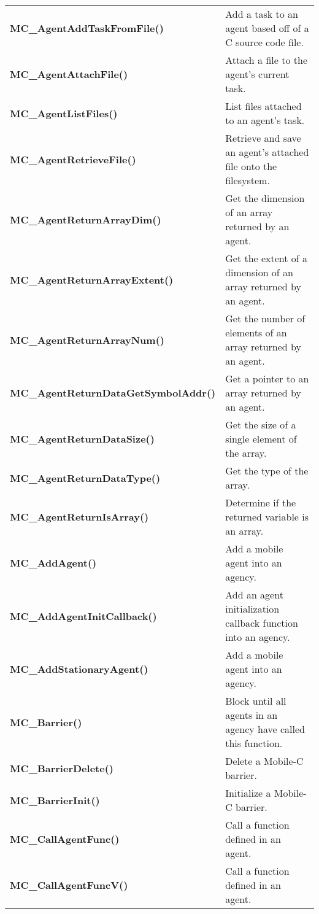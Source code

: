 \begin{table}[!hp]
\begin{center}
\begin{tabular}{p{78 mm}p{77 mm}}
{\bf MC\_AgentAddTaskFromFile()} \dotfill & Add a task to an agent based off of a C source code file. \\
{\bf MC\_AgentAttachFile()} \dotfill & Attach a file to the agent's current task. \\
{\bf MC\_AgentListFiles()} \dotfill & List files attached to an agent's task. \\
{\bf MC\_AgentRetrieveFile()} \dotfill & Retrieve and save an agent's attached file onto the filesystem. \\
{\bf MC\_AgentReturnArrayDim()} \dotfill & Get the dimension of an array returned by an agent. \\
{\bf MC\_AgentReturnArrayExtent()} \dotfill & Get the extent of a dimension of an array returned by an agent. \\
{\bf MC\_AgentReturnArrayNum()} \dotfill & Get the number of elements of an array returned by an agent. \\
{\bf MC\_AgentReturnDataGetSymbolAddr()} \dotfill & Get a pointer to an array returned by an agent. \\
{\bf MC\_AgentReturnDataSize()} \dotfill & Get the size of a single element of the array. \\
{\bf MC\_AgentReturnDataType()} \dotfill & Get the type of the array. \\
{\bf MC\_AgentReturnIsArray()} \dotfill & Determine if the returned variable is an array. \\
{\bf MC\_AddAgent()} \dotfill & Add a mobile agent into an agency. \\
{\bf MC\_AddAgentInitCallback()} \dotfill & Add an agent initialization callback function into an agency. \\
{\bf MC\_AddStationaryAgent()} \dotfill & Add a mobile agent into an agency. \\
{\bf MC\_Barrier()} \dotfill & Block until all agents in an agency have called this function. \\
{\bf MC\_BarrierDelete()} \dotfill & Delete a Mobile-C barrier. \\
{\bf MC\_BarrierInit()} \dotfill & Initialize a Mobile-C barrier. \\
{\bf MC\_CallAgentFunc()} \dotfill & Call a function defined in an agent. \\
{\bf MC\_CallAgentFuncV()} \dotfill & Call a function defined in an agent. \\
\hline
\end{tabular}
\end{center}
\label{mobilec_api_cbinary}
\end{table}

